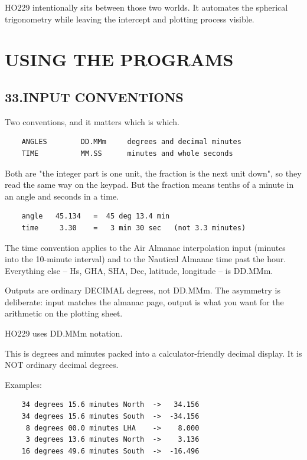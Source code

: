 \documentclass[11pt]{article}
\begin{document}
HO229 intentionally sits between those two worlds. It automates the spherical trigonometry while leaving the intercept and plotting process visible.

\section*{USING THE PROGRAMS}

\subsection*{33.\quad INPUT CONVENTIONS}

Two conventions, and it matters which is which.

\begin{verbatim}
    ANGLES        DD.MMm     degrees and decimal minutes
    TIME          MM.SS      minutes and whole seconds
\end{verbatim}

Both are "the integer part is one unit, the fraction is the next unit down", so they read the same way on the keypad. But the fraction means tenths of a minute in an angle and seconds in a time.

\begin{verbatim}
    angle   45.134   =  45 deg 13.4 min
    time     3.30    =   3 min 30 sec   (not 3.3 minutes)
\end{verbatim}

The time convention applies to the Air Almanac interpolation input (minutes into the 10-minute interval) and to the Nautical Almanac time past the hour. Everything else -- Hs, GHA, SHA, Dec, latitude, longitude -- is DD.MMm.

Outputs are ordinary DECIMAL degrees, not DD.MMm. The asymmetry is deliberate: input matches the almanac page, output is what you want for the arithmetic on the plotting sheet.

HO229 uses DD.MMm notation.

This is degrees and minutes packed into a calculator-friendly decimal display. It is NOT ordinary decimal degrees.

Examples:

\begin{verbatim}
    34 degrees 15.6 minutes North  ->   34.156
    34 degrees 15.6 minutes South  ->  -34.156
     8 degrees 00.0 minutes LHA    ->    8.000
     3 degrees 13.6 minutes North  ->    3.136
    16 degrees 49.6 minutes South  ->  -16.496
\end{verbatim}
\end{document}
